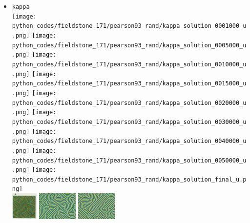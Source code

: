 \begin{itemize}
\item {\tt kappa}\\
\texttt{[image: python\_codes/fieldstone\_171/pearson93\_rand/kappa\_solution\_0001000\_u.png]}
\texttt{[image: python\_codes/fieldstone\_171/pearson93\_rand/kappa\_solution\_0005000\_u.png]}
\texttt{[image: python\_codes/fieldstone\_171/pearson93\_rand/kappa\_solution\_0010000\_u.png]}
\texttt{[image: python\_codes/fieldstone\_171/pearson93\_rand/kappa\_solution\_0015000\_u.png]}
\texttt{[image: python\_codes/fieldstone\_171/pearson93\_rand/kappa\_solution\_0020000\_u.png]}
\texttt{[image: python\_codes/fieldstone\_171/pearson93\_rand/kappa\_solution\_0030000\_u.png]}
\texttt{[image: python\_codes/fieldstone\_171/pearson93\_rand/kappa\_solution\_0040000\_u.png]}
\texttt{[image: python\_codes/fieldstone\_171/pearson93\_rand/kappa\_solution\_0050000\_u.png]}
\texttt{[image: python\_codes/fieldstone\_171/pearson93\_rand/kappa\_solution\_final\_u.png]}\\
\includegraphics[height=1.4cm]{python_codes/fieldstone_171/images/pear93_kappa}
\includegraphics[height=1.4cm]{python_codes/fieldstone_171/images/munafo_kappa1}
\includegraphics[height=1.4cm]{python_codes/fieldstone_171/images/munafo_kappa2}


\end{itemize}
